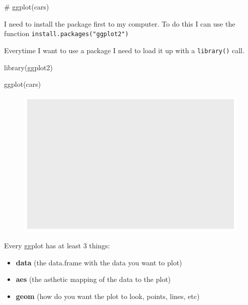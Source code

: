 \documentclass[
  letterpaper,
  DIV=11,
  numbers=noendperiod]{scrartcl}
\newenvironment{Shaded}{\begin{snugshade}}{\end{snugshade}}
\newcommand{\CommentTok}[1]{\textcolor[rgb]{0.37,0.37,0.37}{#1}}
\newcommand{\FunctionTok}[1]{\textcolor[rgb]{0.28,0.35,0.67}{#1}}
\newcommand{\NormalTok}[1]{\textcolor[rgb]{0.00,0.23,0.31}{#1}}
\providecommand{\tightlist}{%
  \setlength{\itemsep}{0pt}\setlength{\parskip}{0pt}}\usepackage{longtable,booktabs,array}
\begin{document}
\begin{Shaded}
\begin{Highlighting}[]
\CommentTok{\# ggplot(cars)}
\end{Highlighting}
\end{Shaded}

I need to install the package first to my computer. To do this I can use
the function \texttt{install.packages("ggplot2")}

Everytime I want to use a package I need to load it up with a
\texttt{library()} call.

\begin{Shaded}
\begin{Highlighting}[]
\FunctionTok{library}\NormalTok{(ggplot2)}
\end{Highlighting}
\end{Shaded}

\begin{Shaded}
\begin{Highlighting}[]
\FunctionTok{ggplot}\NormalTok{(cars)}
\end{Highlighting}
\end{Shaded}

\begin{figure}[H]

{\centering \includegraphics{./-class05_files/figure-pdf/unnamed-chunk-4-1.pdf}

}

\end{figure}

Every ggplot has at least 3 things:

\begin{itemize}
\tightlist
\item
  \textbf{data} (the data.frame with the data you want to plot)
\item
  \textbf{aes} (the asthetic mapping of the data to the plot)
\item
  \textbf{geom} (how do you want the plot to look, points, lines, etc)
\end{itemize}
\end{document}
